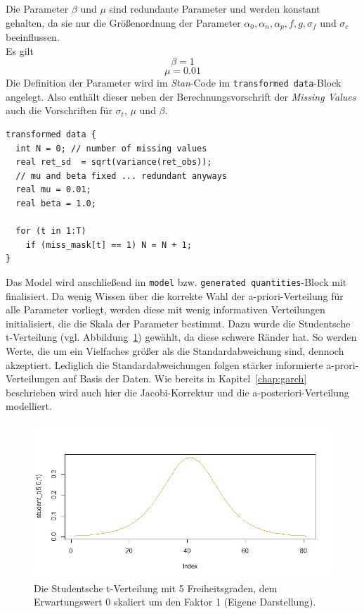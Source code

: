 \documentclass[ngerman]{ttlab-qualify}
\begin{document}
Die Parameter $\beta$ und $\mu$ sind redundante Parameter und werden konstant gehalten, da sie nur die Größenordnung der Parameter $\alpha_0,\alpha_n,\alpha_p, f, g, \sigma_f$ und $\sigma_c$ beeinflussen. \\
Es gilt
\[\beta = 1\]
\[\mu = 0.01\]
Die Definition der Parameter wird im \textit{Stan}-Code im \verb|transformed data|-Block angelegt. Also enthält dieser neben der Berechnungsvorschrift der \textit{Missing Values} auch die Vorschriften für $\sigma_t$, $\mu$ und $\beta$.
\begin{lstlisting}[style=custom]
transformed data {
  int N = 0; // number of missing values
  real ret_sd  = sqrt(variance(ret_obs));
  // mu and beta fixed ... redundant anyways
  real mu = 0.01;
  real beta = 1.0;

  for (t in 1:T)
    if (miss_mask[t] == 1) N = N + 1;
}
\end{lstlisting}
Das Model wird anschließend im \verb|model| bzw. \verb|generated quantities|-Block mit finalisiert. Da wenig Wissen über die korrekte Wahl der a-priori-Verteilung für alle Parameter vorliegt, werden diese mit wenig informativen Verteilungen initialisiert, die die Skala der Parameter bestimmt. Dazu wurde die Studentsche t-Verteilung (vgl. Abbildung~\ref{fig:student-t}) gewählt, da diese schwere Ränder hat. So werden Werte, die um ein Vielfaches größer als die Standardabweichung sind, dennoch akzeptiert. Lediglich die Standardabweichungen folgen stärker informierte a-prori-Verteilungen auf Basis der Daten. Wie bereits in Kapitel~\ref{chap:garch} beschrieben wird auch hier die Jacobi-Korrektur und die a-posteriori-Verteilung modelliert. 

\begin{figure}[H]
\begin{center}
\includegraphics[scale=.5]{images/student_t}
\caption{Die Studentsche t-Verteilung mit 5 Freiheitsgraden, dem Erwartungswert 0 skaliert um den Faktor 1 (Eigene Darstellung).}
\label{fig:student-t}
\end{center}
\end{figure}
\end{document}
